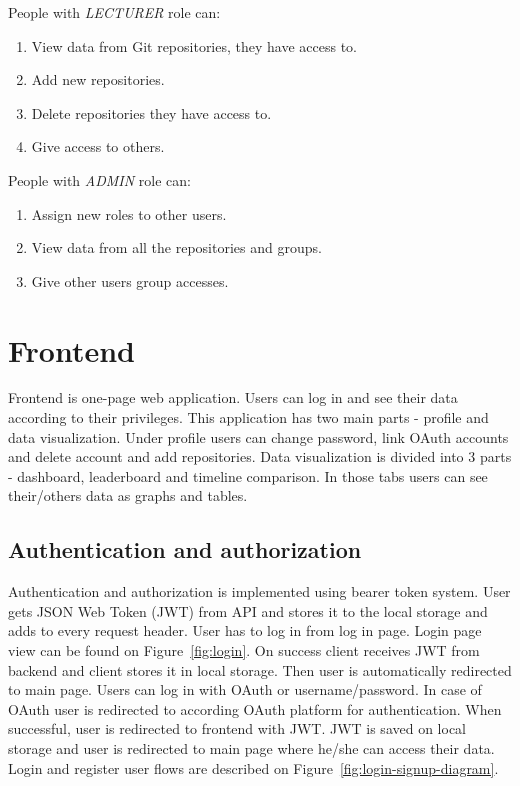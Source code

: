 People with \textit{LECTURER} role can:
\begin{enumerate}
    \item View data from Git repositories, they have access to.
    \item Add new repositories.
    \item Delete repositories they have access to.
    \item Give access to others.
\end{enumerate}

People with \textit{ADMIN} role can:
\begin{enumerate}
    \item Assign new roles to other users.
    \item View data from all the repositories and groups.
    \item Give other users group accesses.
\end{enumerate}

\section{Frontend}\label{sec:frontend-content}
Frontend is one-page web application.
Users can log in and see their data according to their privileges.
This application has two main parts - profile and data visualization.
Under profile users can change password, link OAuth accounts and delete account and add repositories.
Data visualization is divided into 3 parts - dashboard, leaderboard and timeline comparison.
In those tabs users can see their/others data as graphs and tables.

\subsection{Authentication and authorization}\label{subsec:authentication-and-authorization}
Authentication and authorization is implemented using bearer token system.
User gets JSON Web Token (JWT) from API and stores it to the local storage and adds to every request header.
User has to log in from log in page.
Login page view can be found on Figure~\ref{fig:login}.
On success client receives JWT from backend and client stores it in local storage.
Then user is automatically redirected to main page.
Users can log in with OAuth or username/password.
In case of OAuth user is redirected to according OAuth platform for authentication.
When successful, user is redirected to frontend with JWT.
JWT is saved on local storage and user is redirected to main page where he/she can access their data.
Login and register user flows are described on Figure~\ref{fig:login-signup-diagram}.

